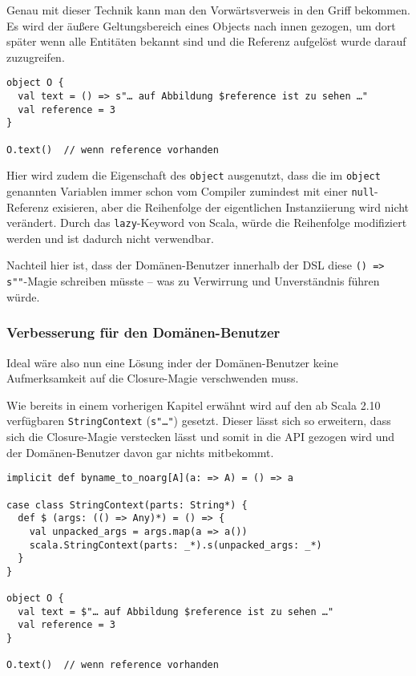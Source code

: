 Genau mit dieser Technik kann man den Vorwärtsverweis in den Griff bekommen.
Es wird der äußere Geltungsbereich eines Objects nach innen gezogen,
um dort später wenn alle Entitäten bekannt sind und die Referenz aufgelöst
wurde darauf zuzugreifen.

\begin{lstlisting}
object O {
  val text = () => s"… auf Abbildung $reference ist zu sehen …"
  val reference = 3
}

O.text()  // wenn reference vorhanden
\end{lstlisting}

Hier wird zudem die Eigenschaft des \lstinline|object| ausgenutzt,
dass die im \lstinline|object| genannten Variablen immer schon vom Compiler
zumindest mit einer \lstinline|null|-Referenz exisieren, aber die Reihenfolge
der eigentlichen Instanziierung wird nicht verändert. Durch das
\lstinline|lazy|-Keyword von Scala, würde die Reihenfolge modifiziert werden
und ist dadurch nicht verwendbar.

Nachteil hier ist, dass der Domänen-Benutzer innerhalb der DSL diese
\lstinline|() => s""|-Magie schreiben müsste -- was zu Verwirrung und
Unverständnis führen würde.


\subsubsection{Verbesserung für den Domänen-Benutzer}

Ideal wäre also nun eine Lösung inder der Domänen-Benutzer keine
Aufmerksamkeit auf die Closure-Magie verschwenden muss.

Wie bereits in einem vorherigen Kapitel %
erwähnt wird auf den ab Scala 2.10 verfügbaren
\lstinline|StringContext| (\lstinline|s"…"|) gesetzt.
Dieser lässt sich so erweitern, dass
sich die Closure-Magie verstecken lässt und somit in die API
gezogen wird und der Domänen-Benutzer davon gar nichts mitbekommt.

\begin{lstlisting}
implicit def byname_to_noarg[A](a: => A) = () => a

case class StringContext(parts: String*) {
  def $ (args: (() => Any)*) = () => {
    val unpacked_args = args.map(a => a())
    scala.StringContext(parts: _*).s(unpacked_args: _*)
  }
}

object O {
  val text = $"… auf Abbildung $reference ist zu sehen …"
  val reference = 3
}

O.text()  // wenn reference vorhanden
\end{lstlisting}

